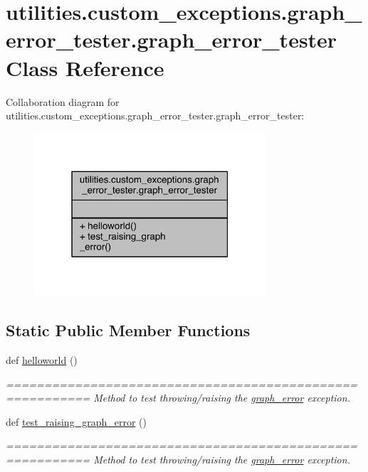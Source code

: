 \hypertarget{classutilities_1_1custom__exceptions_1_1graph__error__tester_1_1graph__error__tester}{}\section{utilities.\+custom\+\_\+exceptions.\+graph\+\_\+error\+\_\+tester.\+graph\+\_\+error\+\_\+tester Class Reference}
\label{classutilities_1_1custom__exceptions_1_1graph__error__tester_1_1graph__error__tester}


Collaboration diagram for utilities.\+custom\+\_\+exceptions.\+graph\+\_\+error\+\_\+tester.\+graph\+\_\+error\+\_\+tester\+:
\nopagebreak
\begin{figure}[H]
\begin{center}
\leavevmode
\includegraphics[width=244pt]{d9/d84/classutilities_1_1custom__exceptions_1_1graph__error__tester_1_1graph__error__tester__coll__graph}
\end{center}
\end{figure}
\subsection*{Static Public Member Functions}
\begin{DoxyCompactItemize}
\item 
def \hyperlink{classutilities_1_1custom__exceptions_1_1graph__error__tester_1_1graph__error__tester_a59e456a82b205066fe96b206ba70411f}{helloworld} ()
\begin{DoxyCompactList}\small\item\em ========================================================= Method to test throwing/raising the \hyperlink{namespaceutilities_1_1custom__exceptions_1_1graph__error}{graph\+\_\+error} exception. \end{DoxyCompactList}\item 
def \hyperlink{classutilities_1_1custom__exceptions_1_1graph__error__tester_1_1graph__error__tester_a844b0064bc87b5d840f5cf3f54d99240}{test\+\_\+raising\+\_\+graph\+\_\+error} ()
\begin{DoxyCompactList}\small\item\em ========================================================= Method to test throwing/raising the \hyperlink{namespaceutilities_1_1custom__exceptions_1_1graph__error}{graph\+\_\+error} exception. \end{DoxyCompactList}\end{DoxyCompactItemize}


